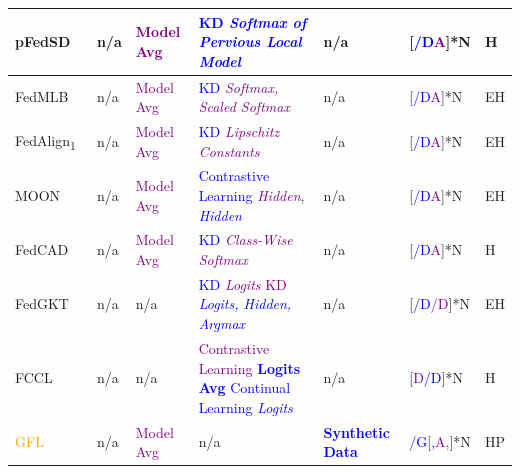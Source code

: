 \begin{table}[htp]
\begin{tabular}{|p{2.05cm}|p{1.36cm}|p{1.56cm}|p{4.35cm}|p{2.77cm}|p{1.5cm}|p{0.35cm}|}
    pFedSD~\cite{jin2022personalized} & n/a & \textcolor{purple}{Model Avg} & \textcolor{blue}{KD \textit{Softmax of Pervious Local Model}} & n/a &[\textcolor{blue}{/D}\textcolor{purple}{A}]*N & H \\ \hline

    \rowcolor[gray]{.9}
    FedMLB~\cite{kim2022multi} & n/a & \textcolor{purple}{Model Avg} &\textcolor{blue}{KD} \textcolor{purple}{\textit{Softmax, Scaled Softmax}} & n/a & [\textcolor{blue}{/D}\textcolor{purple}{A}]*N & EH \\ \hline %

    FedAlign\textsubscript{1}~\cite{mendieta2022local} & n/a &\textcolor{purple}{Model Avg}&\textcolor{blue}{KD}  \textcolor{purple}{\textit{Lipschitz Constants}}~\cite{shang2021lipschitz} & n/a & [\textcolor{blue}{/D}\textcolor{purple}{A}]*N & EH \\ \hline %
    
    \rowcolor[gray]{.9}
    MOON~\cite{li2021model} & n/a & \textcolor{purple}{Model Avg} & \textcolor{blue}{Contrastive Learning} \textcolor{purple}{\textit{Hidden}}, \textcolor{blue}{\textit{Hidden}} & n/a &[\textcolor{blue}{/D}\textcolor{purple}{A}]*N & EH \\ \hline %

    FedCAD~\cite{he2022class} & n/a & \textcolor{purple}{Model Avg} & \textcolor{blue}{KD} \textcolor{purple}{\textit{Class-Wise Softmax}} & n/a & [\textcolor{blue}{/D}\textcolor{purple}{A}]*N & H \\ \hline %

    \rowcolor[gray]{.9}
    FedGKT~\cite{he2020group} & n/a & n/a & \textcolor{blue}{KD} \textcolor{purple}{\textit{Logits}} \textcolor{purple}{KD} \textcolor{blue}{\textit{Logits, Hidden, Argmax}} & n/a & [\textcolor{blue}{/D}\textcolor{purple}{/D}]*N & EH \\ \hline

    FCCL~\cite{huang2022learn} & n/a & n/a & \textcolor{purple}{Contrastive Learning} \textcolor{blue}{\textbf{Logits Avg}} \newline \textcolor{blue}{Continual Learning} \textcolor{blue}{\textit{Logits}} & n/a & [\textcolor{purple}{D}\textcolor{blue}{/D}]*N & H \\ \hline %

    \rowcolor[gray]{.9}
    \textcolor{orange}{GFL}~\cite{cheng2023gfl} & n/a & \textcolor{purple}{Model Avg} & n/a & \textcolor{blue}{\textbf{Synthetic Data}} & \textcolor{blue}{/G}[\textcolor{blue}{,}\textcolor{purple}{A,}]*N & HP \\ \hline


\end{tabular}
\end{table}
